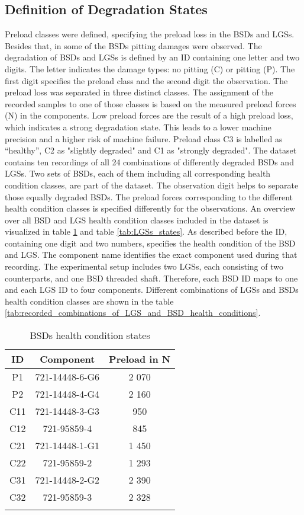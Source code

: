 \subsection{Definition of Degradation States}
Preload classes were defined, specifying the preload loss in the BSDs and LGSs. Besides that, in some of the BSDs pitting damages were observed. The degradation of BSDs and LGSs is defined by an ID containing one letter and two digits. The letter indicates the damage types: no pitting (C) or pitting (P). The first digit specifies the preload class and the second digit the observation. The preload loss was separated in three distinct classes. The assignment of the recorded samples to one of those classes is based on the measured preload forces (N) in the components. Low preload forces are the result of a high preload loss, which indicates a strong degradation state. This leads to a lower machine precision and a higher risk of machine failure. Preload class C3 is labelled as “healthy”, C2 as "slightly degraded" and C1 as "strongly degraded". The dataset contains ten recordings of all 24 combinations of differently degraded BSDs and LGSs. Two sets of BSDs, each of them including all corresponding health condition classes, are part of the dataset. The observation digit helps to separate those equally degraded BSDs. The preload forces corresponding to the different health condition classes is specified differently for the observations. An overview over all BSD and LGS health condition classes included in the dataset is visualized in table \ref {tab:BSDs_states} and table \ref {tab:LGSs_states}. As described before the ID, containing one digit and two numbers, specifies the health condition of the BSD and LGS. The component name identifies the exact component used during that recording. The experimental setup includes two LGSs, each consisting of two counterparts, and one BSD threaded shaft. Therefore, each BSD ID maps to one and each LGS ID to four components. 
Different combinations of LGSs and BSDs health condition classes are shown in the table \ref{tab:recorded_combinations_of_LGS_and_BSD_health_conditions}.


\begin{center}
\begin{longtable}{c c c} 
\toprule
 ID & Component & Preload in N \\ [0.5ex] 
\midrule
 P1 & 721-14448-6-G6 & 2 070 \\ 
 P2 & 721-14448-4-G4 & 2 160 \\ 
 C11 & 721-14448-3-G3 & 950 \\ 
 C12 & 721-95859-4 & 845 \\ 
 C21  & 721-14448-1-G1 & 1 450 \\ [1ex] 
 C22  & 721-95859-2 & 1 293 \\ [1ex] 
 C31  & 721-14448-2-G2 & 2 390 \\ [1ex] 
 C32  & 721-95859-3 & 2 328 \\ [1ex] 
\bottomrule
\caption {BSDs health condition states}
\label {tab:BSDs_states}
\end{longtable}
\end{center}

